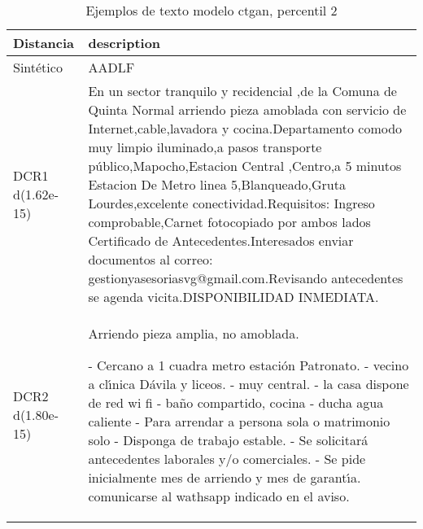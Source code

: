 \begin{table}[H]
\centering
\fontsize{10}{14}\selectfont
\caption{Ejemplos de texto modelo ctgan, percentil 2}
\label{table-example-economicos-b-3-ctgan-2p-text}
\begin{tabular}{|l|m{35em}|}
\hline
\rowcolor[gray]{0.8}
Distancia & description \\
\hline Sintético & AADLF \\
\hline DCR1 d(1.62e-15) & En un sector tranquilo y recidencial ,de  la Comuna de Quinta Normal arriendo pieza amoblada con servicio de Internet,cable,lavadora y cocina.Departamento comodo muy limpio iluminado,a pasos transporte p\'ublico,Mapocho,Estacion Central ,Centro,a 5 minutos Estacion De Metro linea 5,Blanqueado,Gruta Lourdes,excelente conectividad.Requisitos: Ingreso comprobable,Carnet fotocopiado por ambos lados Certificado de Antecedentes.Interesados enviar documentos al correo: gestionyasesoriasvg@gmail.com.Revisando antecedentes  se agenda vicita.DISPONIBILIDAD INMEDIATA. \\
\hline DCR2 d(1.80e-15) &   Arriendo pieza amplia, no amoblada. 

- Cercano a 1 cuadra metro estaci\'on Patronato. 
- vecino a cl{\'\i}nica D\'avila y liceos. - muy central. - la casa dispone de red wi fi 
- ba\~no compartido, cocina 
- ducha agua caliente 
- Para arrendar a persona sola o matrimonio solo 
- Disponga de trabajo estable. 
- Se solicitar\'a antecedentes laborales y/o comerciales. 
- Se pide inicialmente mes de arriendo y mes de garant{\'\i}a. 
  comunicarse al wathsapp indicado en el aviso.
 \\
\hline
\end{tabular}
\end{table}
